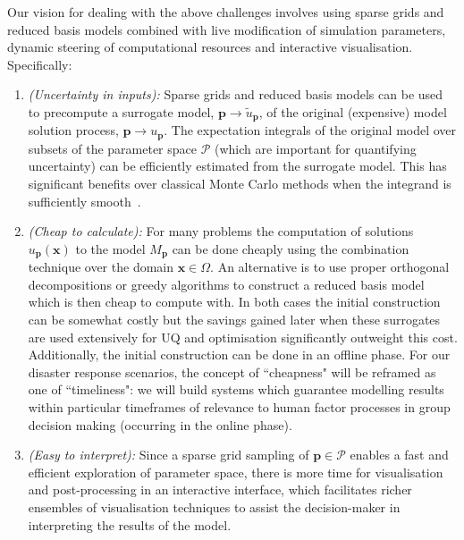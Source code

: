 \documentclass[a4paper,fontsize=13pt]{scrartcl}
\begin{document}
Our vision for dealing with the above challenges
involves using sparse grids and reduced basis models 
combined with live modification
of simulation parameters, dynamic steering of computational resources and
interactive visualisation. Specifically:
\begin{enumerate}
\item \emph{(Uncertainty in inputs):} Sparse grids and reduced basis models can be used
  to precompute a surrogate model, $\mathbf{p} \rightarrow \tilde{u}_{\mathbf{p}}$, of the original
  (expensive) model solution process, $\mathbf{p} \rightarrow {u}_{\mathbf{p}}$.
  The expectation integrals of the original model over subsets of the
  parameter space $\mathcal{P}$ (which are important for quantifying
  uncertainty) can be efficiently estimated from the
  surrogate model. This has
  significant benefits over classical Monte Carlo methods when the
  integrand is sufficiently
  smooth~\parencite{JakemanRoberts2013,FranzelinDiehlPfluger2014}.

\item \emph{(Cheap to calculate):} For many problems the computation of solutions 
  $u_{\mathbf{p}}(\mathbf{x})$ to the model $M_{\mathbf{p}}$ can be done 
  cheaply using the combination technique over the domain
  $\mathbf{x}\in\Omega$.
  An alternative is to use proper orthogonal decompositions or greedy algorithms to construct a reduced basis model which is then cheap to compute with. 
  In both cases the initial construction can be somewhat costly but the savings gained later when these surrogates are used extensively for UQ and optimisation significantly outweight this cost.
  Additionally, the initial construction can be done in an offline phase.
  For our disaster response scenarios, the concept of ``cheapness" will be reframed as one of ``timeliness": we will build systems which guarantee modelling results within particular timeframes of relevance to human factor processes in group decision making (occurring in the online phase).

\item \emph{(Easy to interpret):} Since a sparse grid sampling of $\mathbf{p}\in\mathcal{P}$ enables a fast 
  and efficient exploration of parameter space, there is more time for
  visualisation and post-processing in an interactive interface, which
  facilitates richer ensembles of visualisation techniques to assist the
  decision-maker in interpreting the results of the model.
\end{enumerate}

\end{document}
